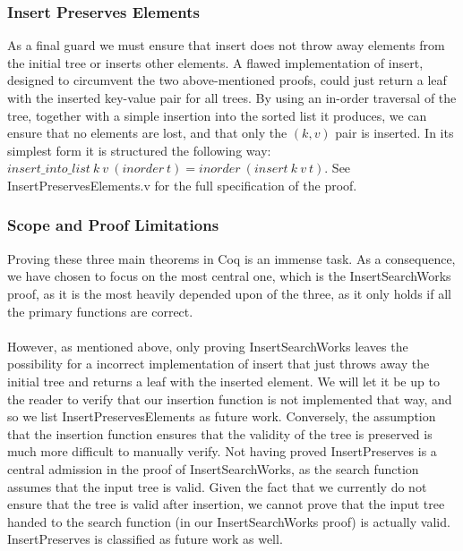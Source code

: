\subsubsection{Insert Preserves Elements}
As a final guard we must ensure that insert does not throw away elements from the initial tree or inserts other elements. A flawed implementation of insert, designed to circumvent the two above-mentioned proofs, could just return a leaf with the inserted key-value pair for all trees. By using an in-order traversal of the tree, together with a simple insertion into the sorted list it produces, we can ensure that no elements are lost, and that only the $(k, v)$ pair is inserted. In its simplest form it is structured the following way: $insert\_into\_list\ k\ v\ (inorder\ t) = inorder\ (insert\ k\ v\ t)$. See InsertPreservesElements.v for the full specification of the proof.

\subsubsection{Scope and Proof Limitations}
Proving these three main theorems in Coq is an immense task. As a consequence, we have chosen to focus on the most central one, which is the InsertSearchWorks proof, as it is the most heavily depended upon of the three, as it only holds if all the primary functions are correct.

\paragraph{}
However, as mentioned above, only proving InsertSearchWorks leaves the possibility for a incorrect implementation of insert that just throws away the initial tree and returns a leaf with the inserted element. We will let it be up to the reader to verify that our insertion function is not implemented that way, and so we list InsertPreservesElements as future work. Conversely, the assumption that the insertion function ensures that the validity of the tree is preserved is much more difficult to manually verify. Not having proved InsertPreserves is a central admission in the proof of InsertSearchWorks, as the search function assumes that the input tree is valid. Given the fact that we currently do not ensure that the tree is valid after insertion, we cannot prove that the input tree handed to the search function (in our InsertSearchWorks proof) is actually valid. InsertPreserves is classified as future work as well.
